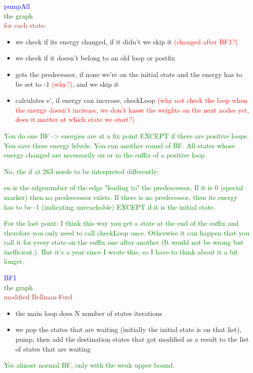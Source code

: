 \documentclass{rapport}
\newcommand{\pscrep}[1]{\textcolor{green}{#1}}
\begin{document}
\vspace{12pt}

\textcolor{blue}{pumpAll}\\
\textcolor[HTML]{006400}{the graph}\\
\textcolor{brown}{for each state:}
\begin{itemize}
    \item we check if its energy changed, if it didn’t we skip it \textcolor{red}{(changed after BF1?)}
    \item we check if it doesn’t belong to an old loop or postfix
    \item gets the predecessor, if none we’re on the initial state and the energy has to be set to -1 \textcolor{red}{(why?)}, and we skip it
    \item calculates e’, if energy can increase, checkLoop \textcolor{red}{(why not check the loop when the energy doesn’t increase, we don’t know the weights on the next nodes yet, does it matter at which state we start?)}
\end{itemize}

\pscrep{You do one BF -> energies are at a fix point EXCEPT if there are positive loops.
You save these energy lelvels. You run another round of BF. All states whose energy changed
are necessarily on or in the suffix of a positive loop.}
\pscrep{No, the if at 263 needs to be interpreted differently:

en is the edgenumber of the edge "leading to" the predescessor. If it is 0
(special marker) then no predescessor exists. If there is no predecessor, then its energy has
to be -1 (indicating unreachable) EXCEPT if it is the initial state.}
\pscrep{For the last point: I think this way you get a state at the end of the suffix
and therefore you only need to call checkLoop once. Otherwise it can happen
that you call it for every state on the suffix one after another (It would not be
wrong but inefficient.). But it's a year since I wrote this, so I have to think about it a
bit longer.}

\vspace{12pt}

\textcolor{blue}{BF1}\\
\textcolor[HTML]{006400}{the graph}\\
\textcolor{brown}{modified Bellman-Ford}
\begin{itemize}
    \item the main loop does N number of states iterations
    \item we pop the states that are waiting (initially the initial state is on that list), pump, then add the destination states that got modified as a result to the list of states that are waiting
\end{itemize}
\pscrep{Yes almost normal BF, only with the weak upper bound.}
\vspace{12pt}
\end{document}
